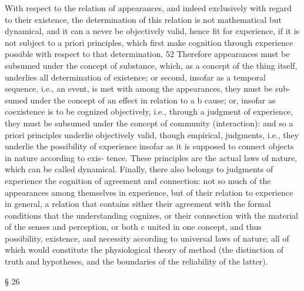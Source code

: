 With respect to the relation of appearances, and indeed exclusively
with regard to their existence, the determination of this relation is
not mathematical but dynamical, and it can a never be objectively valid,
hence ﬁt for experience, if it is not subject to a priori principles, which
ﬁrst make cognition through experience possible with respect to that
determination. 52 Therefore appearances must be subsumed under the
concept of substance, which, as a concept of the thing itself, underlies all
determination of existence; or second, insofar as a temporal sequence,
i.e., an event, is met with among the appearances, they must be sub-
sumed under the concept of an effect in relation to a b cause; or, insofar
as coexistence is to be cognized objectively, i.e., through a judgment of
experience, they must be subsumed under the concept of community
(interaction): and so a priori principles underlie objectively valid, though
empirical, judgments, i.e., they underlie the possibility of experience
insofar as it is supposed to connect objects in nature according to exis-
tence. These principles are the actual laws of nature, which can be called
dynamical.
Finally, there also belongs to judgments of experience the cognition
of agreement and connection: not so much of the appearances among
themselves in experience, but of their relation to experience in general, a
relation that contains either their agreement with the formal conditions
that the understanding cognizes, or their connection with the material
of the senses and perception, or both c united in one concept, and thus
possibility, existence, and necessity according to universal laws of nature;
all of which would constitute the physiological theory of method (the
distinction of truth and hypotheses, and the boundaries of the reliability
of the latter).

§ 26

